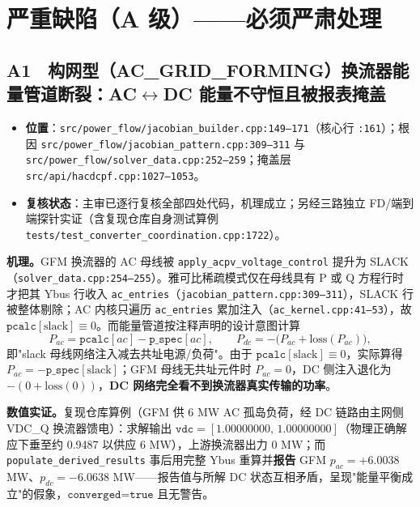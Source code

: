 \documentclass[11pt,a4paper,fontset=fandol]{ctexart}
\newcommand{\file}[1]{\texttt{#1}}
\begin{document}
\section{严重缺陷（A 级）——必须严肃处理}
\label{sec:severe}

\subsection{A1　构网型（AC\_GRID\_FORMING）换流器能量管道断裂：AC$\leftrightarrow$DC 能量不守恒且被报表掩盖}
\label{sec:a1}

\begin{itemize}
  \item \textbf{位置}：\file{src/power\_flow/jacobian\_builder.cpp:149--171}（核心行 \file{:161}）；根因 \file{src/power\_flow/jacobian\_pattern.cpp:309--311} 与 \file{src/power\_flow/solver\_data.cpp:252--259}；掩盖层 \file{src/api/hacdcpf.cpp:1027--1053}。
  \item \textbf{复核状态}：主审已逐行复核全部四处代码，机理成立；另经三路独立 FD/端到端探针实证（含复现仓库自身测试算例 \file{tests/test\_converter\_coordination.cpp:1722}）。
\end{itemize}

\textbf{机理。}GFM 换流器的 AC 母线被 \file{apply\_acpv\_voltage\_control} 提升为 SLACK（\file{solver\_data.cpp:254--255}）。雅可比稀疏模式仅在母线具有 P 或 Q 方程行时才把其 Ybus 行收入 \file{ac\_entries}（\file{jacobian\_pattern.cpp:309--311}），SLACK 行被整体剔除；AC 内核只遍历 \file{ac\_entries} 累加注入（\file{ac\_kernel.cpp:41--53}），故 $\texttt{pcalc}[\text{slack}] \equiv 0$。而能量管道按注释声明的设计意图计算
\begin{equation}
P_{ac} = \texttt{pcalc}[ac] - \texttt{p\_spec}[ac],\qquad P_{dc} = -\bigl(P_{ac} + \mathrm{loss}(P_{ac})\bigr),
\end{equation}
即"slack 母线网络注入减去共址电源/负荷"。由于 $\texttt{pcalc}[\text{slack}]\equiv 0$，实际算得 $P_{ac}=-\texttt{p\_spec}[\text{slack}]$；GFM 母线无共址元件时 $P_{ac}=0$，DC 侧注入退化为 $-(0+\mathrm{loss}(0))$，\textbf{DC 网络完全看不到换流器真实传输的功率}。

\textbf{数值实证。}复现仓库算例（GFM 供 6 MW AC 孤岛负荷，经 DC 链路由主网侧 VDC\_Q 换流器馈电）：求解输出 $\texttt{vdc}=[1.00000000,\,1.00000000]$（物理正确解应下垂至约 0.9487 以供应 6 MW），上游换流器出力 0 MW；而 \file{populate\_derived\_results} 事后用完整 Ybus 重算并\textbf{报告} GFM $p_{ac}=+6.0038$ MW、$p_{dc}=-6.0638$ MW——报告值与所解 DC 状态互相矛盾，呈现"能量平衡成立"的假象，$\texttt{converged=true}$ 且无警告。
\end{document}
